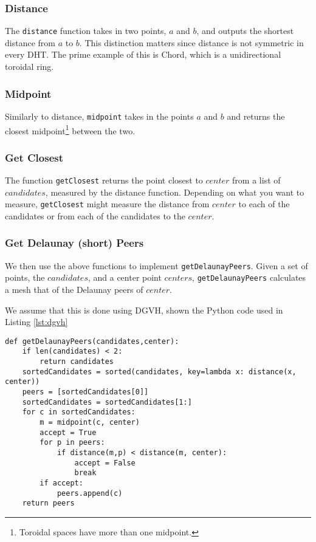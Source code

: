 \documentclass[11pt,conference]{IEEEtran}
\begin{document}
\subsubsection{Distance}
The \texttt{distance} function takes in two points, $a$ and $b$, and outputs the shortest distance from $a$ to $b$.
This distinction matters since distance is not symmetric in every DHT.
The prime example of this is Chord, which is a unidirectional toroidal ring.


\subsubsection{Midpoint}

Similarly to distance, \texttt{midpoint} takes in the points $ a $ and $ b $ and returns the closest midpoint\footnote{Toroidal spaces have more than one midpoint.} between the two.
\subsubsection{Get Closest}
The function \texttt{getClosest} returns the point closest to $ center$ from a list of $ candidates$, measured by the distance function.
Depending on what you want to measure, \texttt{getClosest} might measure the distance from $ center$ to each of the candidates or from each of the candidates to the $ center$.

\subsubsection{Get Delaunay (short) Peers}
We then use the above functions to implement  \texttt{getDelaunayPeers}.
Given a set of points, the $ candidates$, and a center point $ centers$, \texttt{getDelaunayPeers} calculates a mesh that of the Delaunay peers of $ center$.

We assume that this is done using DGVH, shown the Python code used
in Listing \ref{lst:dgvh}

\begin{lstlisting}[basicstyle=\footnotesize\ttfamily,  breaklines=true, caption={\texttt{getDelaunayPeers()}}, label={lst:dgvh}, frame=single] 
def getDelaunayPeers(candidates,center):    
	if len(candidates) < 2:
		return candidates
	sortedCandidates = sorted(candidates, key=lambda x: distance(x, center))
	peers = [sortedCandidates[0]] 
	sortedCandidates = sortedCandidates[1:]
	for c in sortedCandidates:
		m = midpoint(c, center)
		accept = True
		for p in peers:
			if distance(m,p) < distance(m, center):  
				accept = False
				break
		if accept:
			peers.append(c)
	return peers
\end{lstlisting}
\end{document}
